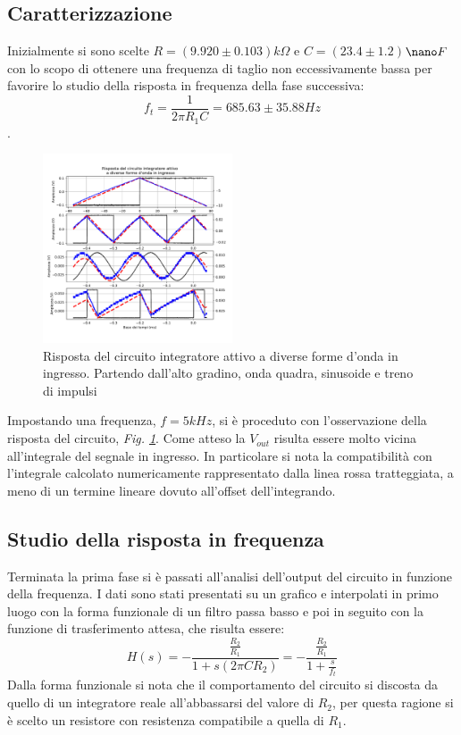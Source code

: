 \documentclass[journal]{IEEEtran}
\begin{document}
\subsection{\textbf{Caratterizzazione}}
Inizialmente si sono scelte $R =$$(9.920 \pm 0.103)$$k\Omega$ e $C=$$(23.4 \pm 1.2)$$\nano F$ con lo scopo di ottenere una frequenza di taglio non eccessivamente bassa per favorire lo studio della risposta in frequenza della fase successiva: \[f_{t} = \frac{1}{2 \pi R_{1} C}= 685.63 \pm 35.88 Hz\].

\begin{figure}[H]%
\begin {center}
\includegraphics[width=0.50\textwidth]{analysis/output/OPA-integ-with-res.pdf}
\caption{Risposta del circuito integratore attivo a diverse forme d'onda in ingresso. Partendo dall'alto gradino, onda quadra, sinusoide e treno di impulsi}
\label{fig:OPA-integ-res}
\end {center}
\end{figure}
Impostando una frequenza, $f= 5 kHz$, si è proceduto con l'osservazione della risposta del circuito, \textit{Fig. \ref{fig:OPA-integ-res}}. Come atteso la $V_{out}$ risulta essere molto vicina all'integrale del segnale in ingresso. In particolare si nota la compatibilità con l'integrale calcolato numericamente rappresentato dalla linea rossa tratteggiata, a meno di un termine lineare dovuto all'offset dell'integrando.
\subsection{\textbf{Studio della risposta in frequenza}}

Terminata la prima fase si è passati all'analisi dell'output del circuito in funzione della frequenza. I dati sono stati presentati su un grafico e interpolati in primo luogo con la forma funzionale di un filtro passa basso e poi in seguito con la funzione di trasferimento attesa, che risulta essere: 
\[H(s) = -\frac{\frac{R_2}{R_1}}{1 + s(2 \pi C R_2)} = -\frac{\frac{R_2}{R_1}}{1 + \frac{s}{f_t}}\]
Dalla forma funzionale si nota che il comportamento del circuito si discosta da quello di un integratore reale all'abbassarsi del valore di $R_2$, per questa ragione si è scelto un resistore con resistenza compatibile a quella di $R_1$.
\end{document}

